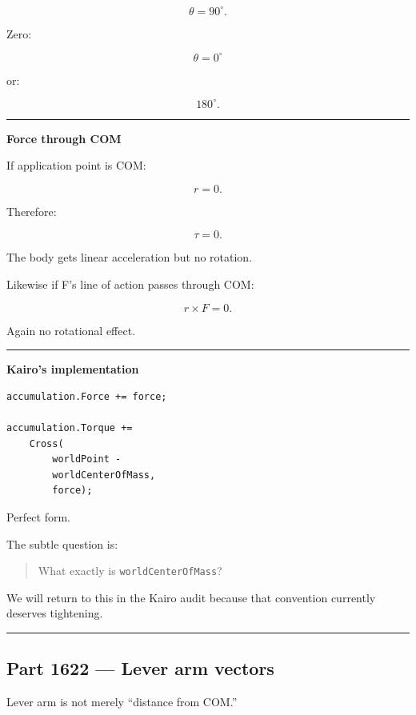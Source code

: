 \[
\theta=90^\circ.
\]

Zero:

\[
\theta=0^\circ
\]

or:

\[
180^\circ.
\]

\begin{center}\rule{0.5\linewidth}{0.5pt}\end{center}

\textbf{Force through COM}

If application point is COM:

\[
r=0.
\]

Therefore:

\[
\tau=0.
\]

The body gets linear acceleration but no rotation.

Likewise if F's line of action passes through COM:

\[
r\times F=0.
\]

Again no rotational effect.

\begin{center}\rule{0.5\linewidth}{0.5pt}\end{center}

\textbf{Kairo's implementation}

\begin{verbatim}
accumulation.Force += force;

accumulation.Torque +=
    Cross(
        worldPoint -
        worldCenterOfMass,
        force);
\end{verbatim}

Perfect form.

The subtle question is:

\begin{quote}
What exactly is \texttt{worldCenterOfMass}?
\end{quote}

We will return to this in the Kairo audit because that convention currently deserves tightening.

\begin{center}\rule{0.5\linewidth}{0.5pt}\end{center}

\subsection{Part 1622 --- Lever arm vectors}\label{06-engine-ii-ch035-part-1622-lever-arm-vectors}

Lever arm is not merely ``distance from COM.''

